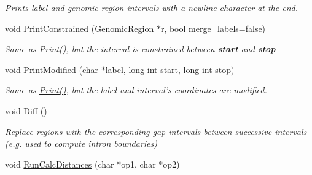 \begin{DoxyCompactItemize}
\begin{DoxyCompactList}\small\item\em Prints label and genomic region intervals with a newline character at the end. \end{DoxyCompactList}\item 
\hypertarget{classGenomicRegionGFF_a96539f4372048c9f0d87826f5856a8ef}{
void \hyperlink{classGenomicRegionGFF_a96539f4372048c9f0d87826f5856a8ef}{PrintConstrained} (\hyperlink{classGenomicRegion}{GenomicRegion} $\ast$r, bool merge\_\-labels=false)}
\label{classGenomicRegionGFF_a96539f4372048c9f0d87826f5856a8ef}

\begin{DoxyCompactList}\small\item\em Same as \hyperlink{classGenomicRegionGFF_a3ffa71d729e4ff060a15a6bab1e924c8}{Print()}, but the interval is constrained between {\bfseries start} and {\bfseries stop} \end{DoxyCompactList}\item 
\hypertarget{classGenomicRegionGFF_a4b331cd12506aa4793a2cf6ea7620936}{
void \hyperlink{classGenomicRegionGFF_a4b331cd12506aa4793a2cf6ea7620936}{PrintModified} (char $\ast$label, long int start, long int stop)}
\label{classGenomicRegionGFF_a4b331cd12506aa4793a2cf6ea7620936}

\begin{DoxyCompactList}\small\item\em Same as \hyperlink{classGenomicRegionGFF_a3ffa71d729e4ff060a15a6bab1e924c8}{Print()}, but the label and interval's coordinates are modified. \end{DoxyCompactList}\item 
\hypertarget{classGenomicRegionGFF_aee70fcc81c9a6629bf0aa1ec37cb1d64}{
void \hyperlink{classGenomicRegionGFF_aee70fcc81c9a6629bf0aa1ec37cb1d64}{Diff} ()}
\label{classGenomicRegionGFF_aee70fcc81c9a6629bf0aa1ec37cb1d64}

\begin{DoxyCompactList}\small\item\em Replace regions with the corresponding gap intervals between successive intervals (e.g. used to compute intron boundaries) \end{DoxyCompactList}\item 
\hypertarget{classGenomicRegionGFF_a0ff4768578a03011fabad309072fade4}{
void \hyperlink{classGenomicRegionGFF_a0ff4768578a03011fabad309072fade4}{RunCalcDistances} (char $\ast$op1, char $\ast$op2)}
\label{classGenomicRegionGFF_a0ff4768578a03011fabad309072fade4}


\end{DoxyCompactItemize}
